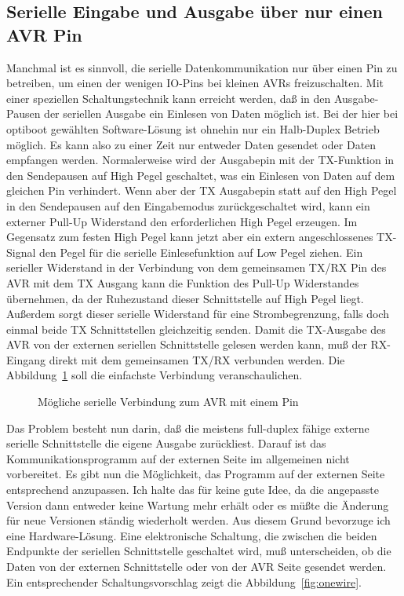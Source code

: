 \subsection{Serielle Eingabe und Ausgabe über nur einen AVR Pin}

Manchmal ist es sinnvoll, die serielle Datenkommunikation nur über einen Pin zu betreiben,
um einen der wenigen IO-Pins bei kleinen AVRs freizuschalten. 
Mit einer speziellen Schaltungstechnik kann erreicht werden, daß in den Ausgabe-Pausen
der seriellen Ausgabe ein Einlesen von Daten möglich ist.
Bei der hier bei optiboot gewählten Software-Lösung ist ohnehin nur ein Halb-Duplex Betrieb
möglich. Es kann also zu einer Zeit nur entweder Daten gesendet oder Daten empfangen werden.
Normalerweise wird der Ausgabepin mit der TX-Funktion in den Sendepausen auf High Pegel
geschaltet, was ein Einlesen von Daten auf dem gleichen Pin verhindert.
Wenn aber der TX Ausgabepin statt auf den High Pegel in den Sendepausen auf den Eingabemodus
zurückgeschaltet wird, kann ein externer Pull-Up Widerstand den erforderlichen High Pegel
erzeugen.
Im Gegensatz zum festen High Pegel kann jetzt aber ein extern angeschlossenes TX-Signal
den Pegel für die serielle Einlesefunktion auf Low Pegel ziehen.
Ein serieller Widerstand in der Verbindung von dem gemeinsamen TX/RX Pin
des AVR mit dem TX Ausgang kann die Funktion des Pull-Up Widerstandes übernehmen,
da der Ruhezustand dieser Schnittstelle auf High Pegel liegt.
Außerdem sorgt dieser serielle Widerstand für eine Strombegrenzung,
falls doch einmal beide TX Schnittstellen gleichzeitig senden.
Damit die TX-Ausgabe des AVR von der externen seriellen Schnittstelle gelesen werden kann,
muß der RX-Eingang direkt mit dem gemeinsamen TX/RX verbunden werden.
Die Abbildung~\ref{fig:onewire-simple} soll die einfachste Verbindung veranschaulichen.

\begin{figure}[H]
\centering
{}
\caption{Mögliche serielle Verbindung zum AVR mit einem Pin}
\label{fig:onewire-simple}
\end{figure}

Das Problem besteht nun darin, daß die meistens full-duplex fähige externe serielle Schnittstelle
die eigene Ausgabe zurückliest.
Darauf ist das Kommunikationsprogramm auf der externen Seite im allgemeinen nicht vorbereitet.
Es gibt nun die Möglichkeit, das Programm auf der externen Seite entsprechend anzupassen.
Ich halte das für keine gute Idee, da die angepasste Version dann entweder keine Wartung
mehr erhält oder es müßte die Änderung für neue Versionen ständig wiederholt werden.
Aus diesem Grund bevorzuge ich eine Hardware-Lösung.
Eine elektronische Schaltung, die zwischen die beiden Endpunkte der seriellen Schnittstelle
geschaltet wird, muß unterscheiden, ob die Daten von der externen Schnittstelle oder
von der AVR Seite gesendet werden.
Ein entsprechender Schaltungsvorschlag zeigt die Abbildung~\ref{fig:onewire}.

